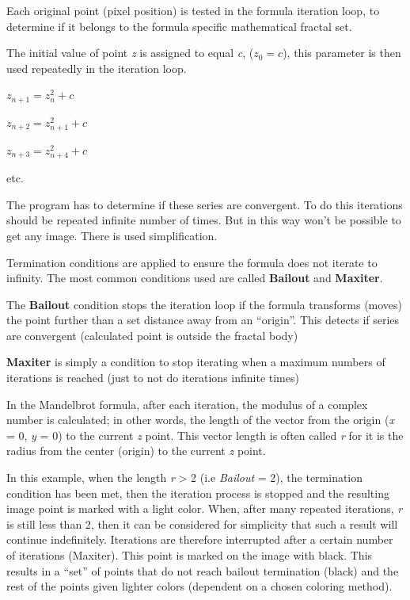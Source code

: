 Each original point (pixel position) is tested in the formula iteration loop, to
determine if it belongs to the formula specific mathematical fractal set.

The initial value of point \emph{z} is assigned to equal \emph{c}, ($ z_{0} = c
$), this parameter is then used repeatedly in the iteration loop.

\(z_{n + 1} = z_{n}^{2} + c\)

\(z_{n + 2} = z_{n + 1}^{2} + c\)

\(z_{n + 3} = z_{n + 4}^{2} + c\)

etc.

The program has to determine if these series are convergent. To do this
iterations should be repeated infinite number of times. But in this way won't be
possible to get any image. There is used simplification.

Termination conditions are applied to ensure the formula does not iterate to
infinity. The most common conditions used are called \textbf{Bailout} and
\textbf{Maxiter}.

The \textbf{Bailout} condition stops the iteration loop if the formula
transforms (moves) the point further than a set distance away from an
``origin''. This detects if series are convergent (calculated point is outside
the fractal body)

\textbf{Maxiter} is simply a condition to stop iterating when a maximum numbers
of iterations is reached (just to not do iterations infinite times)

In the Mandelbrot formula, after each iteration, the modulus of a complex number
is calculated; in other words, the length of the vector from the origin
(\emph{x} = 0, \emph{y} = 0) to the current \emph{z} point. This vector length
is often called \emph{r} for it is the radius from the center (origin) to the
current \emph{z} point.

In this example, when the length \emph{r} \textgreater{} 2 (i.e \emph{Bailout} =
2), the termination condition has been met, then the iteration process is
stopped and the resulting image point is marked with a light color. When, after
many repeated iterations, \emph{r} is still less than 2, then it can be
considered for simplicity that such a result will continue indefinitely.
Iterations are therefore interrupted after a certain number of iterations
(Maxiter). This point is marked on the image with black. This results in a
``set'' of points that do not reach bailout termination (black) and the rest of
the points given lighter colors (dependent on a chosen coloring method).

